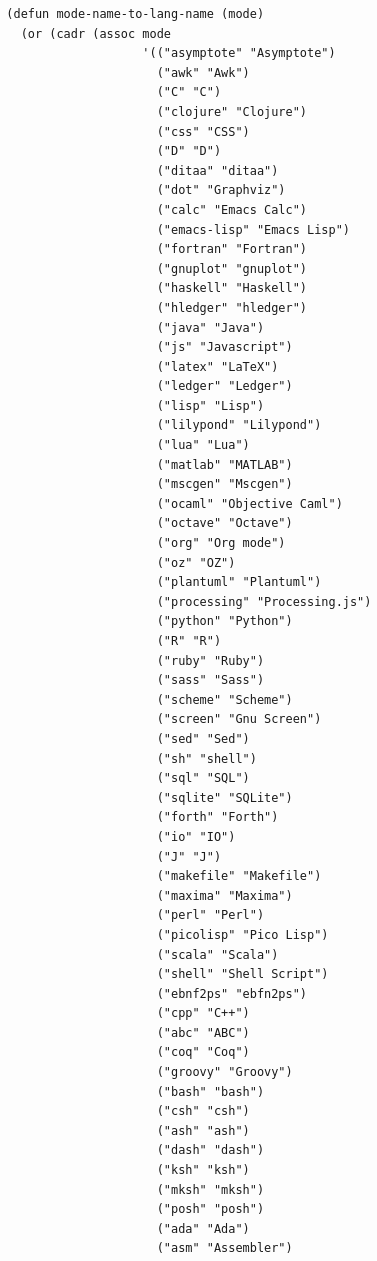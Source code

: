 \documentclass[11pt]{article}
\begin{document}
\begin{verbatim}
  (defun mode-name-to-lang-name (mode)
    (or (cadr (assoc mode
                     '(("asymptote" "Asymptote")
                       ("awk" "Awk")
                       ("C" "C")
                       ("clojure" "Clojure")
                       ("css" "CSS")
                       ("D" "D")
                       ("ditaa" "ditaa")
                       ("dot" "Graphviz")
                       ("calc" "Emacs Calc")
                       ("emacs-lisp" "Emacs Lisp")
                       ("fortran" "Fortran")
                       ("gnuplot" "gnuplot")
                       ("haskell" "Haskell")
                       ("hledger" "hledger")
                       ("java" "Java")
                       ("js" "Javascript")
                       ("latex" "LaTeX")
                       ("ledger" "Ledger")
                       ("lisp" "Lisp")
                       ("lilypond" "Lilypond")
                       ("lua" "Lua")
                       ("matlab" "MATLAB")
                       ("mscgen" "Mscgen")
                       ("ocaml" "Objective Caml")
                       ("octave" "Octave")
                       ("org" "Org mode")
                       ("oz" "OZ")
                       ("plantuml" "Plantuml")
                       ("processing" "Processing.js")
                       ("python" "Python")
                       ("R" "R")
                       ("ruby" "Ruby")
                       ("sass" "Sass")
                       ("scheme" "Scheme")
                       ("screen" "Gnu Screen")
                       ("sed" "Sed")
                       ("sh" "shell")
                       ("sql" "SQL")
                       ("sqlite" "SQLite")
                       ("forth" "Forth")
                       ("io" "IO")
                       ("J" "J")
                       ("makefile" "Makefile")
                       ("maxima" "Maxima")
                       ("perl" "Perl")
                       ("picolisp" "Pico Lisp")
                       ("scala" "Scala")
                       ("shell" "Shell Script")
                       ("ebnf2ps" "ebfn2ps")
                       ("cpp" "C++")
                       ("abc" "ABC")
                       ("coq" "Coq")
                       ("groovy" "Groovy")
                       ("bash" "bash")
                       ("csh" "csh")
                       ("ash" "ash")
                       ("dash" "dash")
                       ("ksh" "ksh")
                       ("mksh" "mksh")
                       ("posh" "posh")
                       ("ada" "Ada")
                       ("asm" "Assembler")

\end{verbatim}
\end{document}
